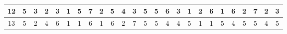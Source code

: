\begin{sidewaystable}[]
\begin{tabular}{|c|c|c|c|c|c|c|c|c|c|c|c|c|c|c|c|c|c|c|c|c|c|c|c|c|}
    12      & 5                                               & 3                                               & 2                                               & 3                                               & 1                                               & 5                                               & 7                                               & 2                                               & 5                                               & 4                                                & 3                                                & 5                                                 &    5                                               & 6                                               & 3                                               & 1                                               & 2                                               & 6                                               & 1                                               & 6                                               & 2                                               & 7                                                & 2                                                & 3                                                \\ \hline
    13      & 5                                               & 2                                               & 4                                               & 6                                               & 1                                               & 1                                               & 6                                               & 1                                               & 6                                               & 2                                                & 7                                                & 5                                                 &    5                                               & 4                                               & 4                                               & 5                                               & 1                                               & 1                                               & 5                                               & 4                                               & 5                                               & 5                                                & 4                                                & 5                                                \\ \hline

\end{tabular}
\end{sidewaystable}

